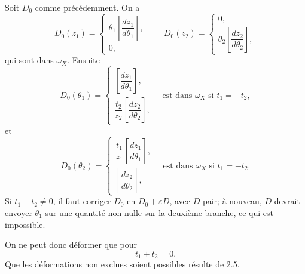 \documentclass[11pt]{article}
\begin{document}
Soit $D_0$ comme précédemment. On a
\[
D_0(z_1)=
\begin{cases}
\theta_1\left[\dfrac{dz_1}{d\theta_1}\right],\\
0,
\end{cases}
\qquad
D_0(z_2)=
\begin{cases}
0,\\
\theta_2\left[\dfrac{dz_2}{d\theta_2}\right],
\end{cases}
\]
qui sont dans $\omega_X$. Ensuite
\[
D_0(\theta_1)=
\begin{cases}
\left[\dfrac{dz_1}{d\theta_1}\right],\\[2mm]
\dfrac{t_2}{z_2}\left[\dfrac{dz_2}{d\theta_2}\right],
\end{cases}
\quad\text{est dans }\omega_X\text{ si }t_1=-t_2,
\]
et
\[
D_0(\theta_2)=
\begin{cases}
\dfrac{t_1}{z_1}\left[\dfrac{dz_1}{d\theta_1}\right],\\[2mm]
\left[\dfrac{dz_2}{d\theta_2}\right],
\end{cases}
\quad\text{est dans }\omega_X\text{ si }t_1=-t_2.
\]
Si $t_1+t_2\ne0$, il faut corriger $D_0$ en $D_0+\varepsilon D$, avec $D$ pair; à nouveau, $D$ devrait envoyer $\theta_1$ sur une quantité non nulle sur la deuxième branche, ce qui est impossible.

On ne peut donc déformer que pour
\[
  t_1+t_2=0.
\]
Que les déformations non exclues soient possibles résulte de 2.5.
\end{document}
